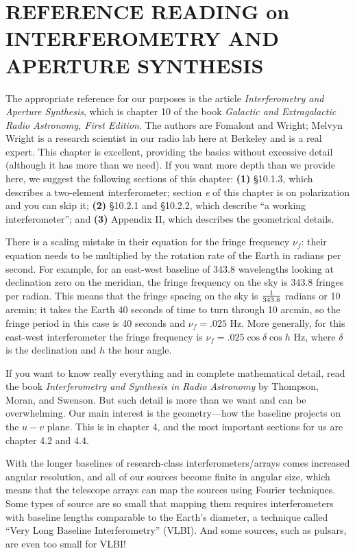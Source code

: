 \documentclass[11pt,preprint]{aastex}
\begin{document}
\section {REFERENCE READING on INTERFEROMETRY AND APERTURE SYNTHESIS}

	The appropriate reference for our purposes is the article {\it
Interferometry and Aperture Synthesis}, which is chapter 10 of the book
{\it Galactic and Extragalactic Radio Astronomy, First Edition}.  The
authors are Fomalont and Wright; Melvyn Wright is a research scientist
in our radio lab here at Berkeley and is a real expert.  This chapter is
excellent, providing the basics without excessive detail (although it
has more than we need).  If you want more depth than we provide here, we
suggest the following sections of this chapter: {\bf (1)} \S10.1.3,
which describes a two-element interferometer; section {\it e} of this
chapter is on polarization and you can skip it; {\bf (2)} \S10.2.1 and
\S10.2.2, which describe ``a working interferometer''; and {\bf (3)}
Appendix II, which describes the geometrical details. 

	There is a scaling mistake in their equation for the fringe
frequency $\nu_f$: their equation needs to be multiplied by the rotation
rate of the Earth in radians per second.  For example, for an east-west
baseline of 343.8 wavelengths looking at declination zero on the
meridian, the fringe frequency on the sky is 343.8 fringes per radian. 
This means that the fringe spacing on the sky is ${1 \over 343.8}$
radians or 10 arcmin; it takes the Earth 40 seconds of time to turn
through 10 arcmin, so the fringe period in this case is 40 seconds and
$\nu_f = .025$ Hz.  More generally, for this east-west interferometer
the fringe frequency is $\nu_f = .025 \cos \delta \cos h$ Hz, where
$\delta$ is the declination and $h$ the hour angle. 

	If you want to know really everything and in complete
mathematical detail, read the book {\it Interferometry and Synthesis in
Radio Astronomy} by Thompson, Moran, and Swenson.  But such detail is
more than we want and can be overwhelming.  Our main interest is the
geometry---how the baseline projects on the $u-v$ plane.  This is in
chapter 4, and the most important sections for us are chapter 4.2 and
4.4. 

With the longer baselines of research-class interferometers/arrays comes
increased angular resolution, and all of our sources become finite in
angular size, which means that the telescope arrays can map the sources
using Fourier techniques. Some types of source are so small that mapping
them requires interferometers with baseline lengths comparable to the
Earth's diameter, a technique called ``Very Long Baseline
Interferometry'' (VLBI). And some sources, such as pulsars, are even too
small for VLBI!
\end{document}
